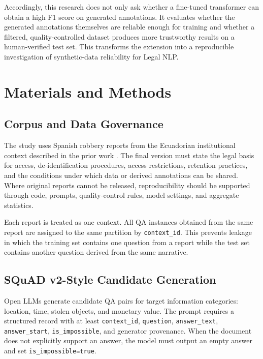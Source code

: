 \documentclass[graybox]{SNmult}
\begin{document}
Accordingly, this research does not only ask whether a fine-tuned transformer can obtain a high F1 score on generated annotations. It evaluates whether the generated annotations themselves are reliable enough for training and whether a filtered, quality-controlled dataset produces more trustworthy results on a human-verified test set. This transforms the extension into a reproducible investigation of synthetic-data reliability for Legal NLP.

\section{Materials and Methods}
\label{sec:methods}

\subsection{Corpus and Data Governance}

The study uses Spanish robbery reports from the Ecuadorian institutional context described in the prior work \cite{falconi2026robberyqa}. The final version must state the legal basis for access, de-identification procedures, access restrictions, retention practices, and the conditions under which data or derived annotations can be shared. Where original reports cannot be released, reproducibility should be supported through code, prompts, quality-control rules, model settings, and aggregate statistics.

Each report is treated as one context. All QA instances obtained from the same report are assigned to the same partition by \texttt{context\_id}. This prevents leakage in which the training set contains one question from a report while the test set contains another question derived from the same narrative.

\subsection{SQuAD v2-Style Candidate Generation}

Open LLMs generate candidate QA pairs for target information categories: location, time, stolen objects, and monetary value. The prompt requires a structured record with at least \texttt{context\_id}, \texttt{question}, \texttt{answer\_text}, \texttt{answer\_start}, \texttt{is\_impossible}, and generator provenance. When the document does not explicitly support an answer, the model must output an empty answer and set \texttt{is\_impossible=true}.
\end{document}
